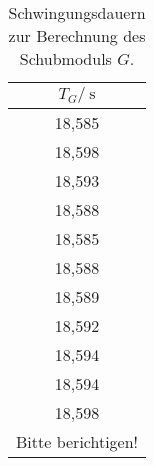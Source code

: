\begin{table}
	\centering
	\begin{tabular}{c}
	\toprule
	{$T_G/\:\si{\second}$}\\
	\midrule
18,585\\
18,598\\
18,593\\
18,588\\
18,585\\
18,588\\
18,589\\
18,592\\
18,594\\
18,594\\
18,598\\
{Bitte berichtigen!}\\
	\bottomrule
	\end{tabular}
	\caption{Schwingungsdauern zur Berechnung des Schubmoduls $G$.}
	\label{tab:T_G}
\end{table}